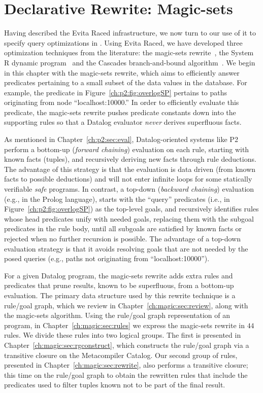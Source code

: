 \chapter[Declarative Rewrite: Magic-sets]{Declarative Rewrite: Magic-sets}
\label{ch:magic}

Having described the Evita Raced infrastructure, we now turn to our use of it
to specify query optimizations in \OVERLOG.  Using Evita Raced, we have
developed three optimization techniques from the literature: the magic-sets
rewrite~\cite{magic-sets1, magic-sets2}, the System R dynamic
program~\cite{selinger} and the Cascades branch-and-bound
algorithm~\cite{cascades}.  We begin in this chapter with the magic-sets
rewrite, which aims to efficiently answer predicates pertaining to a small
subset of the data values in the database.  For example, the 
predicate in Figure~\ref{ch:p2:fig:overlogSP} pertains to paths originating
from node ``localhost:10000.'' In order to efficiently evaluate this predicate,
the magic-sets rewrite pushes predicate constants down into the supporting
rules so that a Datalog evaluator {\em never} derives superfluous facts.

As mentioned in Chapter~\ref{ch:p2:sec:eval}, Datalog-oriented systems like P2
perform a bottom-up ({\em forward chaining}) evaluation on each rule, starting
with known facts (tuples), and recursively deriving new facts through rule
deductions.  The advantage of this strategy is that the evaluation is data
driven (from known facts to possible deductions) and will not enter infinite
loops for some statically verifiable {\em safe} programs.  In contrast, a
top-down ({\em backward chaining}) evaluation (e.g., in the Prolog language),
starts with the ``query'' predicates (i.e., 
in Figure~\ref{ch:p2:fig:overlogSP}) as the top-level goals, and recursively
identifies rules whose head predicates unify with needed goals, replacing them
with the subgoal predicates in the rule body, until all subgoals are satisfied
by known facts or rejected when no further recursion is possible.  The
advantage of a top-down evaluation strategy is that it avoids resolving goals
that are not needed by the posed queries (e.g., paths not originating from
``localhost:10000'').

For a given Datalog program, the magic-sets rewrite adds extra rules and
predicates that prune results, known to be superfluous, from a bottom-up
evaluation.  The primary data structure used by this rewrite technique is a
rule/goal graph, which we review in Chapter~\ref{ch:magic:sec:review}, along
with the magic-sets algorithm.  Using the rule/goal graph representation of an
\OVERLOG program, in Chapter~\ref{ch:magic:sec:rules} we express the magic-sets
rewrite in $44$ \OVERLOG rules.  We divide these rules into two logical groups.
The first is presented in Chapter~\ref{ch:magic:sec:rgconstruct}, which
constructs the rule/goal graph via a transitive closure on the Metacompiler
Catalog.  Our second group of rules, presented in
Chapter~\ref{ch:magic:sec:rewrite}, also performs a transitive closure; this
time on the rule/goal graph to obtain the rewritten rules that include the
predicates used to filter tuples known not to be part of the final result.

